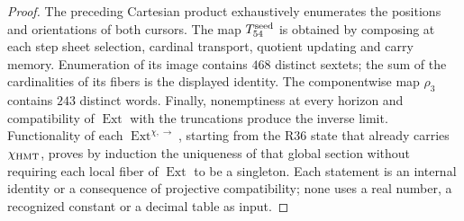 \begin{proof}
The preceding Cartesian product exhaustively enumerates the positions and
orientations of both cursors. The map \(T_{54}^{\rm seed}\) is obtained by
composing at each step sheet selection, cardinal transport,
quotient updating and carry memory. Enumeration of its
image contains \(468\) distinct sextets; the sum of the cardinalities of
its fibers is the displayed identity. The componentwise map
\(\rho_3\) contains \(243\) distinct words. Finally, nonemptiness at
every horizon and compatibility of \(\operatorname{Ext}\) with the
truncations produce the inverse limit. Functionality of each
\(\operatorname{Ext}^{\chi,\rightarrow}\), starting from the R36 state that already
carries \(\chi_{\rm HMT}\), proves by induction the uniqueness of that global
section without requiring each local fiber of \(\operatorname{Ext}\) to be
a singleton. Each statement is an internal identity or a consequence of
projective compatibility; none uses a real number, a
recognized constant or a decimal table as input.
\end{proof}

